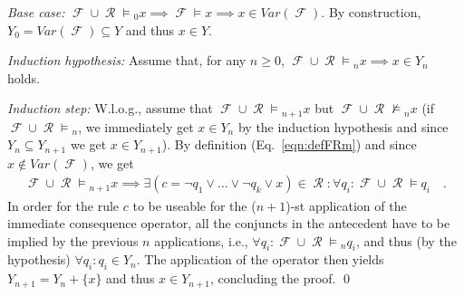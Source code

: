 \documentclass [11pt]{article}
\DeclareMathOperator{\FF}{\mathcal{F}}
\DeclareMathOperator{\RR}{\mathcal{R}}
\newcommand{\FRm}{\ensuremath{\FF \cup \RR \models}}
\newcommand{\FRnm}{\ensuremath{\FF \cup \RR \not \models}}
\begin{document}
\noindent
\emph{Base case:} $\FRm_0 x \implies \FF \models x \implies x \in Var(\FF)$. By construction, $Y_0 = Var(\FF) \subseteq Y$ and thus $x \in Y$.

\noindent
\emph{Induction hypothesis:} Assume that, for any $n\geq 0$, $\FRm_n x \implies x\in Y_n$ holds.

\noindent
\emph{Induction step:} W.l.o.g., assume that $\FRm_{n+1} x$ but $\FRnm_n x$ (if $\FRm_n$, we immediately get $x\in Y_n$ by the induction hypothesis and since $Y_n \subseteq Y_{n+1}$ we get $x \in Y_{n+1}$). 
By definition (Eq.~\ref{eqn:defFRm}) and since $x\not \in Var(\FF)$, we get
\begin{align*}
\FRm_{n+1} x \implies \exists (c=\neg q_1 \lor \dots \lor \neg q_k \lor x)\in \RR: \forall q_i: \FRm q_i \quad .
\end{align*}
In order for the rule $c$ to be useable for the ($n+1$)-st application of the immediate consequence operator, all the conjuncts in the antecedent have to be implied by the previous $n$ applications, i.e., $\forall q_i: \FRm_n q_i$, and thus (by the hypothesis) $\forall q_i: q_i \in Y_n$.
The application of the operator then yields $Y_{n+1} = Y_n + \{x\}$ and thus $x \in Y_{n+1}$, concluding the proof. 
\qed
\end{document}
